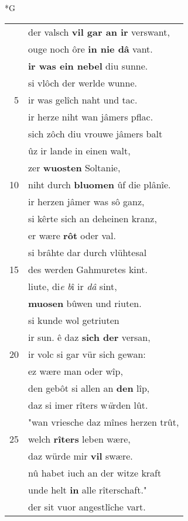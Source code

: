 \documentclass[8pt,a4paper,notitlepage]{article}
\begin{document}
\begin{table}[ht]
\begin{minipage}[t]{0.5\linewidth}
\small
\begin{center}*G
\end{center}
\begin{tabular}{rl}
 & der valsch \textbf{vil gar an ir} verswant,\\ 
 & ouge noch ôre \textbf{in nie dâ} vant.\\ 
 & \textbf{ir was ein nebel} diu sunne.\\ 
 & si vlôch der werlde wunne.\\ 
5 & ir was gelîch naht und tac.\\ 
 & ir herze niht wan jâmers pflac.\\ 
 & sich zôch diu vrouwe jâmers balt\\ 
 & ûz ir lande in einen walt,\\ 
 & zer \textbf{wuosten} Soltanie,\\ 
10 & niht durch \textbf{bluomen} ûf die plânîe.\\ 
 & ir herzen jâmer was sô ganz,\\ 
 & si kêrte sich an deheinen kranz,\\ 
 & er wære \textbf{rôt} oder val.\\ 
 & si brâhte dar durch vlühtesal\\ 
15 & des werden Gahmuretes kint.\\ 
 & liute, di\textit{e} \textit{b}î ir \textit{dâ} sint,\\ 
 & \textbf{muosen} bûwen und riuten.\\ 
 & si kunde wol getriuten\\ 
 & ir sun. ê daz \textbf{sich der} versan,\\ 
20 & ir volc si gar vür sich gewan:\\ 
 & ez wære man oder wîp,\\ 
 & den gebôt si allen an \textbf{den} lîp,\\ 
 & daz si imer rîters w\textit{ü}rden lût.\\ 
 & "wan vriesche daz mînes herzen trût,\\ 
25 & welch \textbf{rîters} leben wære,\\ 
 & daz würde mir \textbf{vil} swære.\\ 
 & nû habet iuch an der witze kraft\\ 
 & unde helt \textbf{in} alle rîterschaft."\\ 
 & der sit vuor angestlîche vart.\\ 

\end{tabular}
\end{minipage}
\end{table}
\end{document}

